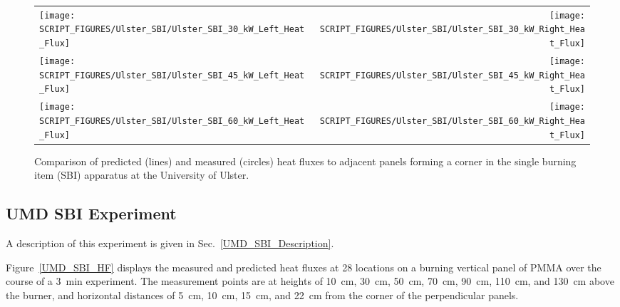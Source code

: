 \begin{figure}[h!]
\begin{tabular*}{\textwidth}{l@{\extracolsep{\fill}}r}
\texttt{[image: SCRIPT\_FIGURES/Ulster\_SBI/Ulster\_SBI\_30\_kW\_Left\_Heat\_Flux]} &
\texttt{[image: SCRIPT\_FIGURES/Ulster\_SBI/Ulster\_SBI\_30\_kW\_Right\_Heat\_Flux]} \\
\texttt{[image: SCRIPT\_FIGURES/Ulster\_SBI/Ulster\_SBI\_45\_kW\_Left\_Heat\_Flux]} &
\texttt{[image: SCRIPT\_FIGURES/Ulster\_SBI/Ulster\_SBI\_45\_kW\_Right\_Heat\_Flux]} \\
\texttt{[image: SCRIPT\_FIGURES/Ulster\_SBI/Ulster\_SBI\_60\_kW\_Left\_Heat\_Flux]} &
\texttt{[image: SCRIPT\_FIGURES/Ulster\_SBI/Ulster\_SBI\_60\_kW\_Right\_Heat\_Flux]}
\end{tabular*}
\label{Ulster_SBI}
\caption[Ulster SBI experiments, corner fire heat flux]
{Comparison of predicted (lines) and measured (circles) heat fluxes to adjacent panels forming a corner in the single
burning item (SBI) apparatus at the University of Ulster.}
\end{figure}

\clearpage

\subsection{UMD SBI Experiment}

A description of this experiment is given in Sec.~\ref{UMD_SBI_Description}.

Figure~\ref{UMD_SBI_HF} displays the measured and predicted heat fluxes at 28 locations on a burning vertical panel of PMMA over the course of a 3~min experiment. The measurement points are at heights of 10~cm, 30~cm, 50~cm, 70~cm, 90~cm, 110~cm, and 130~cm above the burner, and horizontal distances of 5~cm, 10~cm, 15~cm, and 22~cm from the corner of the perpendicular panels.

\newpage

